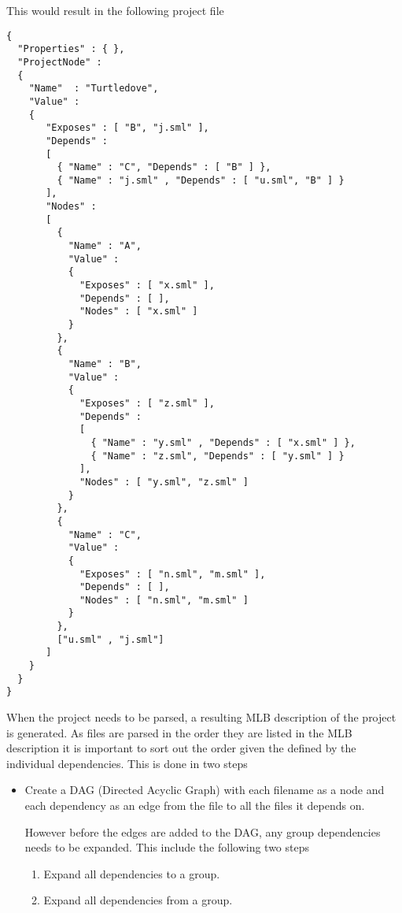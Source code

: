 \begin{description}
\begin{example}
    
    This would result in the following project file

    \begin{lstlisting}
{
  "Properties" : { },
  "ProjectNode" :
  {
    "Name"  : "Turtledove",
    "Value" : 
    {
       "Exposes" : [ "B", "j.sml" ],
       "Depends" : 
       [
         { "Name" : "C", "Depends" : [ "B" ] },
         { "Name" : "j.sml" , "Depends" : [ "u.sml", "B" ] }
       ],
       "Nodes" :
       [
         {
           "Name" : "A",
           "Value" :
           {
             "Exposes" : [ "x.sml" ],
             "Depends" : [ ],
             "Nodes" : [ "x.sml" ]
           }          
         },
         {
           "Name" : "B",
           "Value" :
           {
             "Exposes" : [ "z.sml" ],
             "Depends" :
             [
               { "Name" : "y.sml" , "Depends" : [ "x.sml" ] },
               { "Name" : "z.sml", "Depends" : [ "y.sml" ] }
             ],
             "Nodes" : [ "y.sml", "z.sml" ]
           }          
         },
         {
           "Name" : "C",
           "Value" :
           {
             "Exposes" : [ "n.sml", "m.sml" ],
             "Depends" : [ ],
             "Nodes" : [ "n.sml", "m.sml" ]
           }          
         },
         ["u.sml" , "j.sml"]
       ]
    }
  }
}    
    \end{lstlisting}

  \end{example}

  When the project needs to be parsed, a resulting MLB description of the
  project is generated. As files are parsed in the order they are listed in the
  MLB description it is important to sort out the order given the defined by the
  individual dependencies. This is done in two steps

  \begin{itemize}
  \item Create a DAG (Directed Acyclic Graph) with each filename as a node and
    each dependency as an edge from the file to all the files it depends on.

    However before the edges are added to the DAG, any group dependencies needs
    to be expanded. This include the following two steps

    \begin{enumerate}
    \item \label{item:expand-group-dependency1} Expand all dependencies to a group.
    \item \label{item:expand-group-dependency2} Expand all dependencies from a group.
    \end{enumerate}
    

\end{itemize}
\end{description}
